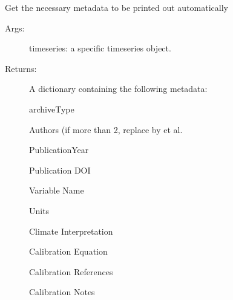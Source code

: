 \documentclass[letterpaper,10pt,english]{sphinxmanual}
\begin{document}
\begin{fulllineitems}
\label{\detokenize{SummaryPlots:pyleoclim.SummaryPlots.getMetadata}}
Get the necessary metadata to be printed out automatically
\begin{description}
\item[{Args:}] \leavevmode
timeseries: a specific timeseries object.

\item[{Returns:}] \leavevmode
A dictionary containing the following metadata:

archiveType

Authors (if more than 2, replace by et al.

PublicationYear

Publication DOI

Variable Name

Units

Climate Interpretation

Calibration Equation

Calibration References

Calibration Notes

\end{description}

\end{fulllineitems}

\end{document}
